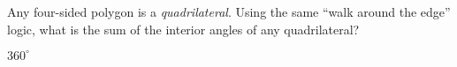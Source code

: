 \begin{Exercise}[title={Interior Angles of a Quadrilateral}, label=interior_of_quad]
  Any four-sided polygon is a \emph{quadrilateral}.  Using the same
  ``walk around the edge'' logic, what is the sum of the interior
  angles of any quadrilateral?
\end{Exercise}
\begin{Answer}[ref=interior_of_quad]
$360^\circ$
\end{Answer}

